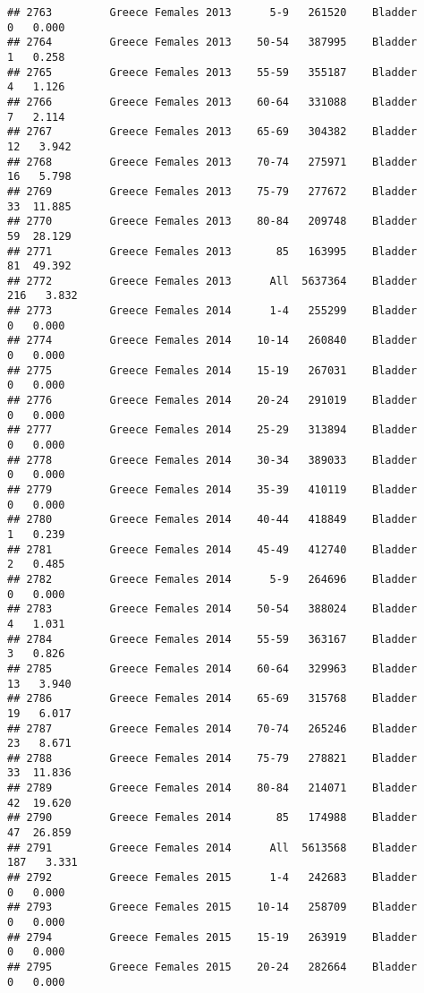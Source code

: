 \documentclass[
]{article}
\begin{document}
\begin{verbatim}
## 2763         Greece Females 2013      5-9   261520    Bladder      0   0.000
## 2764         Greece Females 2013    50-54   387995    Bladder      1   0.258
## 2765         Greece Females 2013    55-59   355187    Bladder      4   1.126
## 2766         Greece Females 2013    60-64   331088    Bladder      7   2.114
## 2767         Greece Females 2013    65-69   304382    Bladder     12   3.942
## 2768         Greece Females 2013    70-74   275971    Bladder     16   5.798
## 2769         Greece Females 2013    75-79   277672    Bladder     33  11.885
## 2770         Greece Females 2013    80-84   209748    Bladder     59  28.129
## 2771         Greece Females 2013       85   163995    Bladder     81  49.392
## 2772         Greece Females 2013      All  5637364    Bladder    216   3.832
## 2773         Greece Females 2014      1-4   255299    Bladder      0   0.000
## 2774         Greece Females 2014    10-14   260840    Bladder      0   0.000
## 2775         Greece Females 2014    15-19   267031    Bladder      0   0.000
## 2776         Greece Females 2014    20-24   291019    Bladder      0   0.000
## 2777         Greece Females 2014    25-29   313894    Bladder      0   0.000
## 2778         Greece Females 2014    30-34   389033    Bladder      0   0.000
## 2779         Greece Females 2014    35-39   410119    Bladder      0   0.000
## 2780         Greece Females 2014    40-44   418849    Bladder      1   0.239
## 2781         Greece Females 2014    45-49   412740    Bladder      2   0.485
## 2782         Greece Females 2014      5-9   264696    Bladder      0   0.000
## 2783         Greece Females 2014    50-54   388024    Bladder      4   1.031
## 2784         Greece Females 2014    55-59   363167    Bladder      3   0.826
## 2785         Greece Females 2014    60-64   329963    Bladder     13   3.940
## 2786         Greece Females 2014    65-69   315768    Bladder     19   6.017
## 2787         Greece Females 2014    70-74   265246    Bladder     23   8.671
## 2788         Greece Females 2014    75-79   278821    Bladder     33  11.836
## 2789         Greece Females 2014    80-84   214071    Bladder     42  19.620
## 2790         Greece Females 2014       85   174988    Bladder     47  26.859
## 2791         Greece Females 2014      All  5613568    Bladder    187   3.331
## 2792         Greece Females 2015      1-4   242683    Bladder      0   0.000
## 2793         Greece Females 2015    10-14   258709    Bladder      0   0.000
## 2794         Greece Females 2015    15-19   263919    Bladder      0   0.000
## 2795         Greece Females 2015    20-24   282664    Bladder      0   0.000

\end{verbatim}
\end{document}
